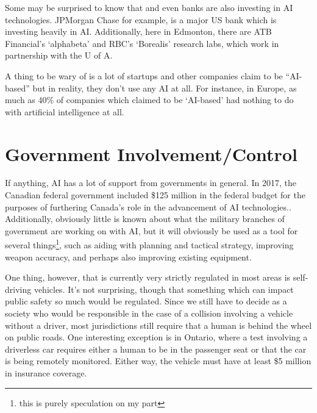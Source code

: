 \documentclass[letterpaper,12pt]{article}
\begin{document}
Some may be surprised to know that and even banks are also investing in AI technologies.
JPMorgan Chase for example, is a major US bank which is investing heavily in AI.
Additionally, here in Edmonton, there are ATB Financial's `alphabeta' and RBC's
`Borealis' research labs, which work in partnership with the U of A.

A thing to be wary of is a lot of startups and other companies claim to be ``AI-based''
but in reality, they don't use any AI at all. For instance, in Europe, as much as 
40\% of companies which claimed to be `AI-based' had nothing to do
with artificial intelligence at all.
\cite{fakeaistartups}


\section{Government Involvement/Control}
If anything, AI has a lot of support from governments in general.
In 2017, the Canadian federal government included \$125 million in the
federal budget for the purposes of furthering Canada's role in the
advancement of AI technologies.\cite{canadafederalfunding}. 
Additionally, obviously little is known about what the military
branches of government are working on with AI, but it will obviously
be used as a tool for several things\footnote{this is purely speculation on my part},
such as aiding with 
planning and tactical strategy, improving weapon accuracy, and perhaps also improving
existing equipment.

One thing, however, that is currently very strictly regulated
in most areas is self-driving vehicles. It's not surprising,
though that something which can impact public safety so much
would be regulated. Since we still have to decide as a society
who would be responsible in the case of a collision
involving a vehicle without a driver, most
jurisdictions still require that a human is behind the wheel on public roads.
One interesting exception is in Ontario, where a test involving a driverless car
requires either a human to be in the passenger seat or that the car is being
remotely monitored. Either way, the vehicle must have at least \$5 million
in insurance coverage.\cite{ontariodriverless}
\end{document}
